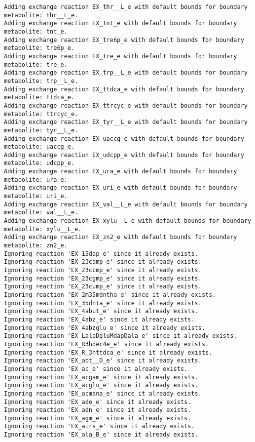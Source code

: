 \documentclass[
  letterpaper,
  DIV=11,
  numbers=noendperiod]{scrartcl}
\begin{document}
\begin{verbatim}
Adding exchange reaction EX_thr__L_e with default bounds for boundary metabolite: thr__L_e.
Adding exchange reaction EX_tnt_e with default bounds for boundary metabolite: tnt_e.
Adding exchange reaction EX_tre6p_e with default bounds for boundary metabolite: tre6p_e.
Adding exchange reaction EX_tre_e with default bounds for boundary metabolite: tre_e.
Adding exchange reaction EX_trp__L_e with default bounds for boundary metabolite: trp__L_e.
Adding exchange reaction EX_ttdca_e with default bounds for boundary metabolite: ttdca_e.
Adding exchange reaction EX_ttrcyc_e with default bounds for boundary metabolite: ttrcyc_e.
Adding exchange reaction EX_tyr__L_e with default bounds for boundary metabolite: tyr__L_e.
Adding exchange reaction EX_uaccg_e with default bounds for boundary metabolite: uaccg_e.
Adding exchange reaction EX_udcpp_e with default bounds for boundary metabolite: udcpp_e.
Adding exchange reaction EX_ura_e with default bounds for boundary metabolite: ura_e.
Adding exchange reaction EX_uri_e with default bounds for boundary metabolite: uri_e.
Adding exchange reaction EX_val__L_e with default bounds for boundary metabolite: val__L_e.
Adding exchange reaction EX_xylu__L_e with default bounds for boundary metabolite: xylu__L_e.
Adding exchange reaction EX_zn2_e with default bounds for boundary metabolite: zn2_e.
Ignoring reaction 'EX_15dap_e' since it already exists.
Ignoring reaction 'EX_23camp_e' since it already exists.
Ignoring reaction 'EX_23ccmp_e' since it already exists.
Ignoring reaction 'EX_23cgmp_e' since it already exists.
Ignoring reaction 'EX_23cump_e' since it already exists.
Ignoring reaction 'EX_2m35mdntha_e' since it already exists.
Ignoring reaction 'EX_35dnta_e' since it already exists.
Ignoring reaction 'EX_4abut_e' since it already exists.
Ignoring reaction 'EX_4abz_e' since it already exists.
Ignoring reaction 'EX_4abzglu_e' since it already exists.
Ignoring reaction 'EX_LalaDgluMdapDala_e' since it already exists.
Ignoring reaction 'EX_R3hdec4e_e' since it already exists.
Ignoring reaction 'EX_R_3httdca_e' since it already exists.
Ignoring reaction 'EX_abt__D_e' since it already exists.
Ignoring reaction 'EX_ac_e' since it already exists.
Ignoring reaction 'EX_acgam_e' since it already exists.
Ignoring reaction 'EX_acglu_e' since it already exists.
Ignoring reaction 'EX_acmana_e' since it already exists.
Ignoring reaction 'EX_ade_e' since it already exists.
Ignoring reaction 'EX_adn_e' since it already exists.
Ignoring reaction 'EX_agm_e' since it already exists.
Ignoring reaction 'EX_airs_e' since it already exists.
Ignoring reaction 'EX_ala_B_e' since it already exists.

\end{verbatim}
\end{document}
